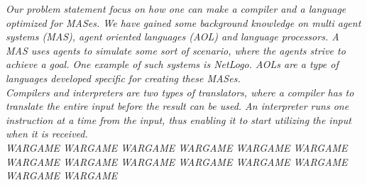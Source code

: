 \vspace{30pt}

\textit{Our problem statement focus on how one can make a compiler and a language optimized for MASes. We have gained some background knowledge on multi agent systems (MAS), agent oriented languages (AOL) and language processors. A MAS uses agents to simulate some sort of scenario, where the agents strive to achieve a goal. One example of such systems is NetLogo\cite{misc:netlogo}. AOLs are a type of languages developed specific for creating these MASes.\\ \indent
Compilers and interpreters are two types of translators, where a compiler has to translate the entire input before the result
can be used. An interpreter runs one instruction at a time from the input, thus enabling it to start utilizing the input when it is received.\\ \indent
WARGAME WARGAME WARGAME WARGAME WARGAME WARGAME WARGAME WARGAME WARGAME WARGAME WARGAME WARGAME WARGAME WARGAME}